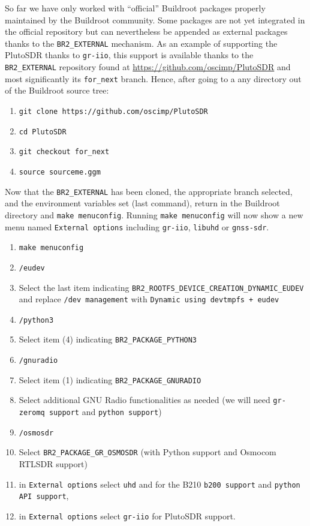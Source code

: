 \documentclass[a4paper]{article}
\begin{document}
So far we have only worked with ``official'' Buildroot packages properly maintained by
the Buildroot community. Some packages are not yet integrated in the official repository
but can nevertheless be appended as external packages thanks to the {\tt BR2\_EXTERNAL}
mechanism. As an example of supporting the PlutoSDR thanks to {\tt gr-iio}, this support
is available thanks to the {\tt BR2\_EXTERNAL} repository found at 
\url{https://github.com/oscimp/PlutoSDR} and most significantly its {\tt for\_next} branch.
Hence, after going to a any directory out of the Buildroot source tree:
\begin{enumerate}
\item \verb~git clone https://github.com/oscimp/PlutoSDR~
\item \verb~cd PlutoSDR~
\item \verb~git checkout for_next~
\item \verb~source sourceme.ggm~
\end{enumerate}

Now that the {\tt BR2\_EXTERNAL} has been cloned, the appropriate branch selected, and the
environment variables set (last command), return in the Buildroot directory and
{\tt make menuconfig}. Running {\tt make menuconfig} will now show a new menu named 
{\tt External options} including
{\tt gr-iio}, {\tt libuhd} or {\tt gnss-sdr}. 

\begin{enumerate}
\item \verb~make menuconfig~
\item \verb~/eudev~
\item Select the last item indicating {\tt BR2\_ROOTFS\_DEVICE\_CREATION\_DYNAMIC\_EUDEV} and
replace {\tt /dev management} with {\tt Dynamic using devtmpfs + eudev}
\item \verb~/python3~
\item Select item (4) indicating {\tt BR2\_PACKAGE\_PYTHON3}
\item \verb~/gnuradio~
\item Select item (1) indicating {\tt BR2\_PACKAGE\_GNURADIO}
\item Select additional GNU Radio functionalities as needed (we will need {\tt gr-zeromq support}
and {\tt python support})
\item \verb~/osmosdr~
\item Select {\tt BR2\_PACKAGE\_GR\_OSMOSDR} (with Python support and Osmocom RTLSDR support)
\item in {\tt External options} select {\tt uhd} and for the B210 {\tt b200 support} and 
{\tt python API support}, 
\item in {\tt External options} select {\tt gr-iio} for PlutoSDR support.
\end{enumerate}
\end{document}
